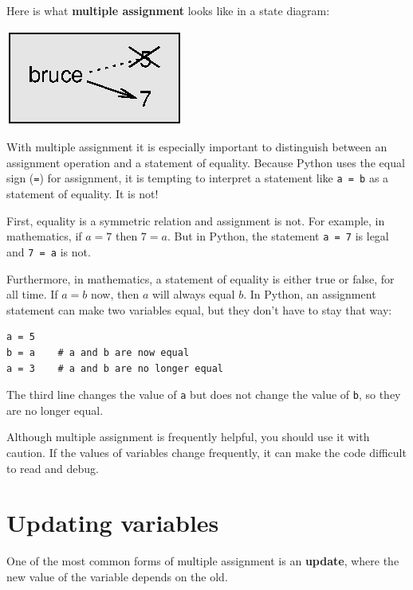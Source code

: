 \documentclass[10pt]{book}
\begin{document}

Here is what {\bf multiple assignment} looks like in a state diagram:


\beforefig
\centerline{\includegraphics{figs/assign2.eps}}
\afterfig

With multiple assignment it is especially important to distinguish
between an assignment operation and a statement of equality.  Because
Python uses the equal sign ({\tt =}) for assignment, it is tempting to
interpret a statement like {\tt a = b} as a statement of equality. It
is not!


First, equality is a symmetric relation and assignment is not.  For
example, in mathematics, if $a = 7$ then $7 = a$.  But in Python, the
statement {\tt a = 7} is legal and {\tt 7 = a} is not.

Furthermore, in mathematics, a statement of equality is either true or
false, for all time.  If $a = b$ now, then $a$ will always equal $b$.
In Python, an assignment statement can make two variables equal, but
they don't have to stay that way:

\beforeverb
\begin{verbatim}
a = 5
b = a    # a and b are now equal
a = 3    # a and b are no longer equal
\end{verbatim}
\afterverb
%
The third line changes the value of {\tt a} but does not change the
value of {\tt b}, so they are no longer equal. 

Although multiple assignment is frequently helpful, you should use it
with caution.  If the values of variables change frequently, it can
make the code difficult to read and debug.


\section{Updating variables}
\label{update}


One of the most common forms of multiple assignment is an {\bf update},
where the new value of the variable depends on the old.
\end{document}
